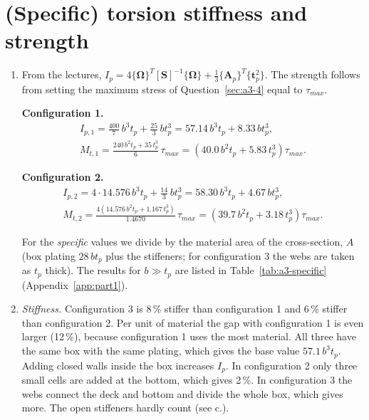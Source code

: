 \section{(Specific) torsion stiffness and strength}
\label{sec:a3-5}

\begin{enumerate}[label=\alph*., leftmargin=*]
  \item From the lectures, $I_p = 4\{\boldsymbol{\Omega}\}^T[\mathbf{S}]^{-1}\{\boldsymbol{\Omega}\} + \frac13\{\mathbf{A}_p\}^T\{\mathbf{t}_p^2\}$. The strength follows from setting the maximum stress of Question~\ref{sec:a3-4} equal to $\tau_{max}$.

  \textbf{Configuration 1.}
  \begin{gather*}
    I_{p,1} = \frac{400}{7}\,b^3t_p + \frac{25}{3}\,bt_p^3 = 57.14\,b^3t_p + 8.33\,bt_p^3,\\
    M_{t,1} = \frac{240\,b^2t_p + 35\,t_p^3}{6}\,\tau_{max} = \left(40.0\,b^2t_p + 5.83\,t_p^3\right)\tau_{max}.
  \end{gather*}

  \textbf{Configuration 2.}
  \begin{gather*}
    I_{p,2} = 4\cdot14.576\,b^3t_p + \frac{14}{3}\,bt_p^3 = 58.30\,b^3t_p + 4.67\,bt_p^3,\\
    M_{t,2} = \frac{4\left(14.576\,b^2t_p + 1.167\,t_p^3\right)}{1.4670}\,\tau_{max} = \left(39.7\,b^2t_p + 3.18\,t_p^3\right)\tau_{max}.
  \end{gather*}

  For the \emph{specific} values we divide by the material area of the cross-section, $A$ (box plating $28\,bt_p$ plus the stiffeners; for configuration 3 the webs are taken as $t_p$ thick). The results for $b\gg t_p$ are listed in Table~\ref{tab:a3-specific} (Appendix~\ref{app:part1}).
  


  \item \emph{Stiffness.} Configuration 3 is 8\,\% stiffer than configuration 1 and 6\,\% stiffer than configuration 2. Per unit of material the gap with configuration 1 is even larger (12\,\%), because configuration 1 uses the most material. All three have the same box with the same plating, which gives the base value $57.1\,b^3t_p$. Adding closed walls inside the box increases $I_p$. In configuration 2 only three small cells are added at the bottom, which gives 2\,\%. In configuration 3 the webs connect the deck and bottom and divide the whole box, which gives more. The open stiffeners hardly count (see c.).


\end{enumerate}
